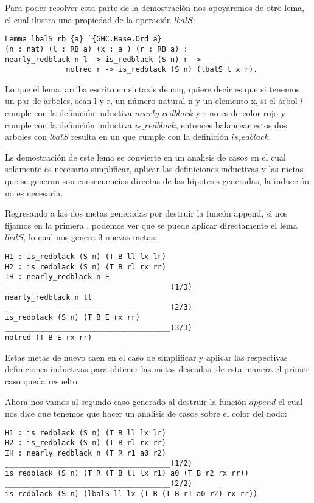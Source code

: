 Para poder resolver esta parte de la demostraci\'on nos apoyaremos de otro lema, el cual ilustra
una propiedad de la operaci\'on $lbalS$:

\begin{verbatim}
Lemma lbalS_rb {a} `{GHC.Base.Ord a}
(n : nat) (l : RB a) (x : a ) (r : RB a) :
nearly_redblack n l -> is_redblack (S n) r ->
              notred r -> is_redblack (S n) (lbalS l x r).
\end{verbatim}

Lo que el lema, arriba escrito en sintaxis de coq, quiere decir es que si tenemos un par de
arboles, sean l y r, un n\'umero natural n y un elemento x, si el \'arbol $l$ cumple con la
definici\'on inductiva $nearly\_redblack$ y r no es de color rojo y cumple con la definici\'on
inductiva $is\_redblack$, entonces balancear estos dos arboles con $lbalS$ resulta en un {\arn}
que cumple con la definici\'on $is_redblack$.

Ls demostraci\'on de este lema se convierte en un analisis de casos en el cual solamente es
necesario simplificar, aplicar las definiciones inductivas y las metas que se generan son
consecuencias directas de las hipotesis generadas, la inducci\'on no es necesaria.

Regresando a las dos metas generadas por destruir la func\'on append, si nos fijamos en la primera
, podemos ver que se puede aplicar directamente el lema $lbalS$, lo cual nos genera 3 nuevas metas:

\begin{verbatim}
H1 : is_redblack (S n) (T B ll lx lr)
H2 : is_redblack (S n) (T B rl rx rr)
IH : nearly_redblack n E
______________________________________(1/3)
nearly_redblack n ll
______________________________________(2/3)
is_redblack (S n) (T B E rx rr)
______________________________________(3/3)
notred (T B E rx rr)
\end{verbatim}

Estas metas de nuevo caen en el caso de simplificar y aplicar las respectivas definiciones
inductivas para obtener las metas deseadas, de esta manera el primer caso queda resuelto.

Ahora nos vamos al segundo caso generado al destruir la funci\'on $append$ el cual nos dice que
tenemos que hacer un analisis de casos sobre el color del nodo:

\begin{verbatim}
H1 : is_redblack (S n) (T B ll lx lr)
H2 : is_redblack (S n) (T B rl rx rr)
IH : nearly_redblack n (T R r1 a0 r2)
______________________________________(1/2)
is_redblack (S n) (T R (T B ll lx r1) a0 (T B r2 rx rr))
______________________________________(2/2)
is_redblack (S n) (lbalS ll lx (T B (T B r1 a0 r2) rx rr))
\end{verbatim}

